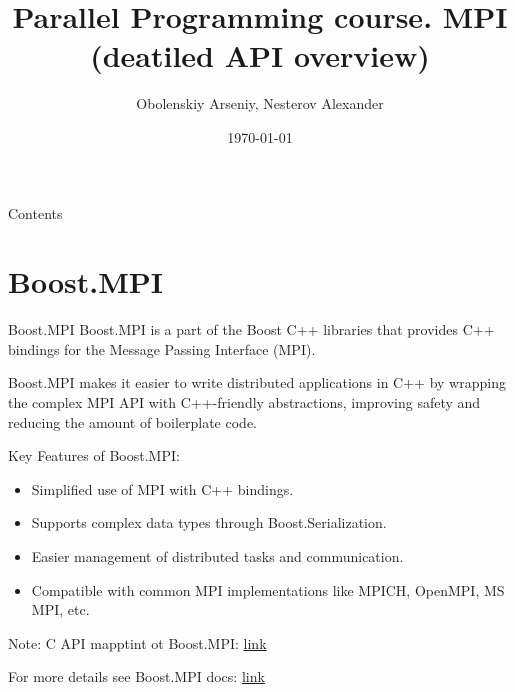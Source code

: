 \documentclass{beamer}
\title[Parallel Programming. MPI (deatiled API overview)]{Parallel Programming course. MPI (deatiled API overview)}
\author{Obolenskiy Arseniy, Nesterov Alexander}
\institute{Nizhny Novgorod State University}
\date{\today} %
\begin{document}
\begin{frame}
    \titlepage
\end{frame}

\begin{frame}{Contents}
    \tableofcontents
\end{frame}

\section{Boost.MPI}

\begin{frame}{Boost.MPI}
  Boost.MPI is a part of the Boost C++ libraries that provides C++ bindings for the Message Passing Interface (MPI).

  Boost.MPI makes it easier to write distributed applications in C++ by wrapping the complex MPI API with C++-friendly abstractions, improving safety and reducing the amount of boilerplate code.

  Key Features of Boost.MPI:
  \begin{itemize}
    \item Simplified use of MPI with C++ bindings.
    \item Supports complex data types through Boost.Serialization.
    \item Easier management of distributed tasks and communication.
    \item Compatible with common MPI implementations like MPICH, OpenMPI, MS MPI, etc.
  \end{itemize}

  Note: C API mapptint ot Boost.MPI: \href{https://www.boost.org/doc/libs/1_86_0/doc/html/mpi/c_mapping.html}{link}

  {\footnotesize For more details see Boost.MPI docs: \href{https://www.boost.org/doc/libs/1_86_0/doc/html/mpi.html}{link}}
\end{frame}
\end{document}
